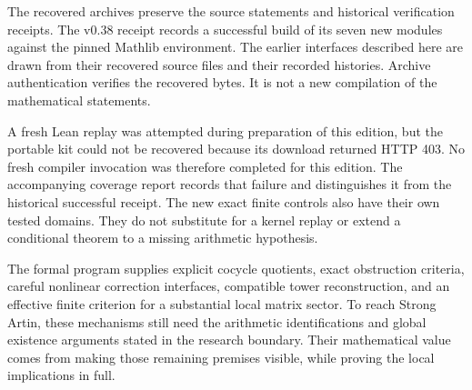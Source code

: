 The recovered archives preserve the source statements and historical
verification receipts. The v0.38 receipt records a successful build of its
seven new modules against the pinned Mathlib environment. The earlier
interfaces described here are drawn from their recovered source files and
their recorded histories. Archive authentication verifies the recovered
bytes. It is not a new compilation of the mathematical statements.

A fresh Lean replay was attempted during preparation of this edition, but
the portable kit could not be recovered because its download returned
HTTP 403. No fresh compiler invocation was therefore completed for this
edition. The accompanying coverage report records that failure and
distinguishes it from the historical successful receipt. The new exact
finite controls also have their own tested domains. They do not substitute
for a kernel replay or extend a conditional theorem to a missing
arithmetic hypothesis.

The formal program supplies explicit cocycle quotients, exact obstruction
criteria, careful nonlinear correction interfaces, compatible tower
reconstruction, and an effective finite criterion for a substantial local
matrix sector. To reach Strong Artin, these mechanisms still need the
arithmetic identifications and global existence arguments stated in the
research boundary. Their mathematical value comes from making those
remaining premises visible, while proving the local implications in full.
